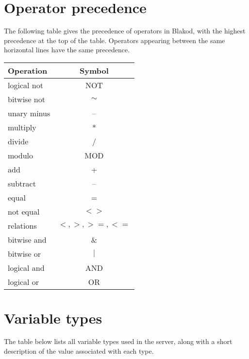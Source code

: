 \documentclass[12pt]{article}
\begin{document}

\newpage
\appendix
\section{Operator precedence}

The following table gives the precedence of operators in Blakod, with
the highest precedence at the top of the table.  Operators appearing
between the same horizontal lines have the same precedence.

\begin{center}
\begin{tabular}{||l|c||} \hline
Operation      & Symbol
\\ \hline \hline
logical not    & NOT \\
bitwise not    &  $\sim$ \\
unary minus    &  -- \\
\hline 
multiply       &  *  \\
divide         &  /  \\
modulo         & MOD \\
\hline 
add            &  +  \\
subtract       &  -- \\
\hline 
equal          &  =  \\
not equal      & $<>$ \\
relations      & $<, >, >=, <=$ \\
\hline 
bitwise and    & \&  \\
\hline 
bitwise or     & $|$ \\
\hline 
logical and    & AND \\
\hline 
logical or     & OR  \\
\hline
\end{tabular}
\end{center}


\newpage
\section{Variable types}

The table below lists all variable types used in the server, along
with a short description of the value associated with each type.
\end{document}
